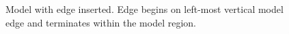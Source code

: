 \documentclass[a4paper, 12pt]{article}
\begin{document}
\begin{figure}[H]
  \centering
  \caption{Model with edge inserted. 
        Edge begins on left-most vertical model edge
        and terminates within the model region.}
  \label{fig:edge4model}
\end{figure}
\end{document}
